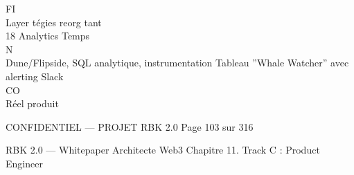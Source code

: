 \vspace{0.5em}
\vspace{0.5em}
\vspace{0.5em}
\vspace{0.5em}
FI\\
Layer                   tégies reorg                                      tant\\
18      Analytics Temps\\
N\\
Dune/Flipside, SQL analytique, instrumentation Tableau ”Whale Watcher” avec alerting Slack\\
CO\\
Réel                    produit\\
\vspace{0.5em}
\vspace{0.5em}
\vspace{0.5em}
\vspace{0.5em}
\begin{confidential}CONFIDENTIEL — PROJET RBK 2.0                                  Page 103 sur 316\end{confidential}
RBK 2.0 — Whitepaper Architecte Web3                                                                Chapitre 11. Track C : Product Engineer\\
\vspace{0.5em}
\vspace{0.5em}
